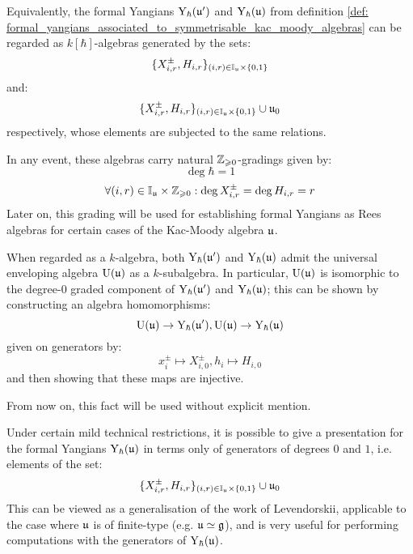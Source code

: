         \begin{remark} \label{remark: positive_Z_grading_on_formal_yangians}
            Equivalently, the formal Yangians $\mathrm{Y}_{\hbar}(\mathfrak{u}')$ and $\mathrm{Y}_{\hbar}(\mathfrak{u})$ from definition \ref{def: formal_yangians_associated_to_symmetrisable_kac_moody_algebras} can be regarded as $k[\hbar]$-algebras generated by the sets:
                $$\{X_{i, r}^{\pm}, H_{i, r}\}_{(i, r) \in \simpleroots_{\fraku} \x \{0, 1\}}$$
            and:
                $$\{X_{i, r}^{\pm}, H_{i, r}\}_{(i, r) \in \simpleroots_{\fraku} \x \{0, 1\}} \cup \fraku_0$$
            respectively, whose elements are subjected to the same relations.

            In any event, these algebras carry natural $\mathbb{Z}_{\geqslant 0}$-gradings given by:
                $$\deg \hbar = 1$$
                $$\forall (i, r) \in \simpleroots_{\fraku} \x \Z_{\geq 0}: \deg X^{\pm}_{i, r} = \deg H_{i, r} = r$$
            Later on, this grading will be used for establishing formal Yangians as Rees algebras for certain cases of the Kac-Moody algebra $\mathfrak{u}$.
        \end{remark}
        \begin{remark}
            When regarded as a $k$-algebra, both $\mathrm{Y}_{\hbar}(\mathfrak{u}')$ and $\mathrm{Y}_{\hbar}(\mathfrak{u})$ admit the universal enveloping algebra $\mathrm{U}(\mathfrak{u})$ as a $k$-subalgebra. In particular, $\mathrm{U}(\mathfrak{u})$ is isomorphic to the degree-$0$ graded component of $\mathrm{Y}_{\hbar}(\mathfrak{u}')$ and $\mathrm{Y}_{\hbar}(\mathfrak{u})$; this can be shown by constructing an algebra homomorphisms:
                $$\mathrm{U}(\mathfrak{u}) \to \mathrm{Y}_{\hbar}(\mathfrak{u}'), \mathrm{U}(\mathfrak{u}) \to \mathrm{Y}_{\hbar}(\mathfrak{u})$$
            given on generators by:
                $$x_i^{\pm} \mapsto X_{i, 0}^{\pm}, h_i \mapsto H_{i, 0}$$
            and then showing that these maps are injective. 

            From now on, this fact will be used without explicit mention.
        \end{remark}

        Under certain mild technical restrictions, it is possible to give a presentation for the formal Yangians $\mathrm{Y}_{\hbar}(\mathfrak{u})$ in terms only of generators of degrees $0$ and $1$, i.e. elements of the set:
            $$\{X_{i, r}^{\pm}, H_{i, r}\}_{(i, r) \in \simpleroots_{\fraku} \x \{0, 1\}} \cup \fraku_0$$
        This can be viewed as a generalisation of the work \cite{levendorskii_finite_type_yangians_presentation} of Levendorskii, applicable to the case where $\mathfrak{u}$ is of finite-type (e.g. $\mathfrak{u} \simeq \mathfrak{g}$), and is very useful for performing computations with the generators of $\mathrm{Y}_{\hbar}(\mathfrak{u})$.
        
